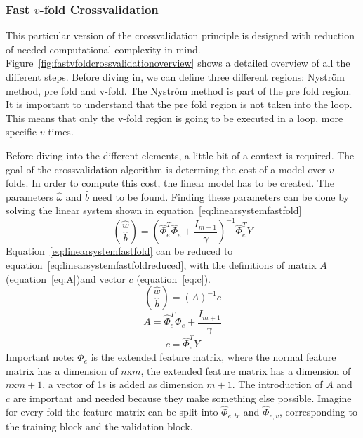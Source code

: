 \subsubsection{Fast $v$-fold Crossvalidation}\label{subsec:fastvfoldcv}
This particular version of the crossvalidation principle is designed with reduction of needed computational complexity in mind.
Figure~\ref{fig:fastvfoldcrossvalidationoverview} shows a detailed overview of all the different steps.
Before diving in, we can define three different regions: Nystr\"om method, pre fold and v-fold.
The Nystr\"om method is part of the pre fold region.
It is important to understand that the pre fold region is not taken into the loop.
This means that only the v-fold region is going to be executed in a loop, more specific $v$ times.
\par
Before diving into the different elements, a little bit of a context is required.
The goal of the crossvalidation algorithm is determing the cost of a model over $v$ folds.
In order to compute this cost, the linear model has to be created. 
The parameters $\hat{\omega}$ and $\hat{b}$ need to be found. 
Finding these parameters can be done by solving the linear system shown in equation~\ref{eq:linearsystemfastfold}
\begin{equation}
	\binom{\hat{w}}{\hat{b}} = \left( \hat{\Phi}_e^T\hat{\Phi}_e + \frac{I_{m+1}}{\gamma} \right)^{-1} \hat{\Phi}_e^TY
	\label{eq:linearsystemfastfold}
\end{equation}
Equation~\ref{eq:linearsystemfastfold} can be reduced to equation~\ref{eq:linearsystemfastfoldreduced}, with the definitions of matrix $A$ (equation~\ref{eq:A})and vector $c$ (equation~\ref{eq:c}).
\begin{equation}
	\binom{\hat{w}}{\hat{b}} = \left( A \right)^{-1} c
	\label{eq:linearsystemfastfoldreduced}
\end{equation}
\begin{equation}
	A = \hat{\Phi}_e^T\hat{\Phi}_e + \frac{I_{m+1}}{\gamma}
	\label{eq:A}
\end{equation}
\begin{equation}
	c = \hat{\Phi}_e^TY
	\label{eq:c}
\end{equation}
Important note: $\hat{\Phi}_e$ is the extended feature matrix, where the normal feature matrix has a dimension of $n$x$m$, the extended feature matrix has a dimension of $n$x$m+1$, a vector of 1s is added as dimension $m+1$.
The introduction of $A$ and $c$ are important and needed because they make something else possible.
Imagine for every fold the feature matrix can be split into $\hat{\Phi}_{e,tr}$ and $\hat{\Phi}_{e,v}$, corresponding to the training block and the validation block.
